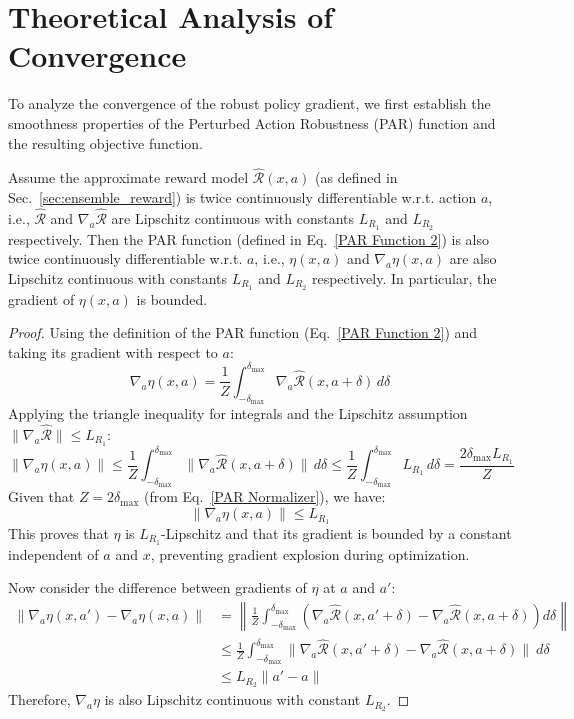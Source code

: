 \documentclass[./dissertation.tex]{subfiles}
\begin{document}
\chapter{Theoretical Analysis of Convergence}
\label{sec:convergence}

To analyze the convergence of the robust policy gradient, we first establish the smoothness properties of the Perturbed Action Robustness (PAR) function and the resulting objective function.

\begin{lemma}
Assume the approximate reward model $\hat{\mathcal{R}}(x, a)$ (as defined in Sec.~\ref{sec:ensemble_reward}) is twice continuously differentiable w.r.t. action $a$, i.e., $\hat{\mathcal{R}}$ and $\nabla_a\hat{\mathcal{R}}$ are Lipschitz continuous with constants $L_{R_1}$ and $L_{R_2}$ respectively.
Then the PAR function (defined in Eq.~\ref{PAR Function 2}) is also twice continuously differentiable w.r.t. $a$, i.e., $\eta(x,a)$ and $\nabla_a\eta(x,a)$ are also Lipschitz continuous with constants $L_{R_1}$ and $L_{R_2}$ respectively. In particular, the gradient of $\eta(x, a)$ is bounded.
\label{lem:PAR_smoothness}
\end{lemma}

\begin{proof}
Using the definition of the PAR function (Eq.~\ref{PAR Function 2}) and taking its gradient with respect to $a$:
\[ \nabla_a \eta(x, a) = \frac{1}{Z} \int_{-\delta_\text{max}}^{\delta_\text{max}} \nabla_a \hat{\mathcal{R}}(x, a + \delta) \, d\delta \]
Applying the triangle inequality for integrals and the Lipschitz assumption $\|\nabla_a \hat{\mathcal{R}}\| \leq L_{R_1}$:
\[ \|\nabla_a \eta(x, a)\| \leq \frac{1}{Z} \int_{-\delta_\text{max}}^{\delta_\text{max}} \|\nabla_a \hat{\mathcal{R}}(x, a + \delta)\| \, d\delta \leq \frac{1}{Z} \int_{-\delta_\text{max}}^{\delta_\text{max}} L_{R_1} \, d\delta = \frac{2\delta_\text{max} L_{R_1}}{Z}\]
Given that $Z = 2\delta_\text{max}$ (from Eq.~\ref{PAR Normalizer}), we have:
\[ \|\nabla_a \eta(x, a)\| \leq L_{R_1} \]
This proves that $\eta$ is $L_{R_1}$-Lipschitz and that its gradient is bounded by a constant independent of $a$ and $x$, preventing gradient explosion during optimization.

Now consider the difference between gradients of $\eta$ at $a$ and $a'$:
\begin{align}
    \|\nabla_a \eta(x, a') - \nabla_a \eta(x, a)\| &= \left\| \frac{1}{Z} \int_{-\delta_\text{max}}^{\delta_\text{max}} \left( \nabla_a \hat{\mathcal{R}}(x, a'+\delta) - \nabla_a \hat{\mathcal{R}}(x, a+\delta) \right) d\delta \right\| \nonumber \\
    &\le \frac{1}{Z} \int_{-\delta_\text{max}}^{\delta_\text{max}} \| \nabla_a \hat{\mathcal{R}}(x, a'+\delta) - \nabla_a \hat{\mathcal{R}}(x, a+\delta) \| \ d\delta \nonumber \\
    &\le L_{R_2} \|a' - a\|\nonumber 
\end{align}
Therefore, $\nabla_a \eta$ is also Lipschitz continuous with constant $L_{R_2}$.
\end{proof}
\end{document}
